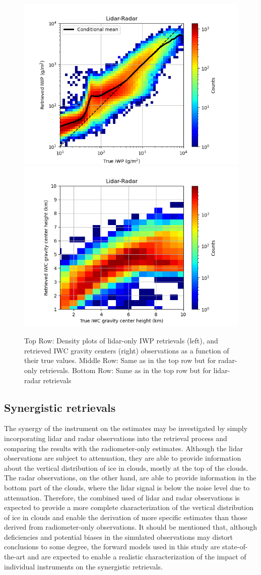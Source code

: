 \documentclass{ametsocV6.1}
\begin{document}
\begin{figure}
    \includegraphics[width=.481\linewidth]{fig7e0.png}
    \includegraphics[width=.481\linewidth]{fig7e.png}
    \caption{Top Row: Density plots of lidar-only IWP retrievals (left), and retrieved IWC gravity centers (right) observations as a function of their true values. Middle Row: Same as in the top row but for radar-only retrievals. Bottom Row: Same as in the top row but for lidar-radar retrievals}\label{f7}
\end{figure}

\subsection{Synergistic retrievals}

The synergy of the instrument on the estimates may be investigated by simply incorporating lidar and radar observations into the retrieval process and comparing the results with the radiometer-only estimates.  Although the lidar observations are subject to attenuation, they are able to provide information about the vertical distribution of ice in clouds, mostly at the top of the clouds. The radar observations, on the other hand, are able to provide information in the bottom part of the clouds, where the lidar signal is below the noise level due to attenuation. Therefore, the combined used of lidar and radar observations is expected to provide a more complete characterization of the vertical distribution of ice in clouds and enable the derivation of more specific estimates than those derived from radiometer-only observations. It should be mentioned that, although deficiencies and potential biases in the simulated observations may distort conclusions to some degree, the forward models used in this study are state-of-the-art and are expected to enable a realistic characterization of the impact of individual instruments on the synergistic retrievals.
\end{document}
